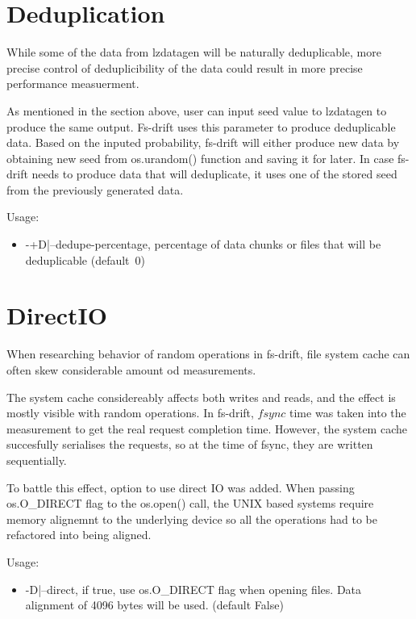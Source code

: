 \documentclass[
  color, %
  table, %
  lof,   %
  lot,   %
]{fithesis3}
\begin{document}
\section{Deduplication}
While some of the data from lzdatagen will be naturally deduplicable, more precise control of deduplicibility of the data could result in more precise performance measuerment.

As mentioned in the section above, user can input seed value to lzdatagen to produce the same output. Fs-drift uses this parameter to produce deduplicable data. Based on the inputed probability, fs-drift will either produce new data by obtaining new seed from os.urandom() function and saving it for later. In case fs-drift needs to produce data that will deduplicate, it uses one of the stored seed from the previously generated data.

Usage:
\begin{itemize}
    \item -+D|--dedupe-percentage, percentage of data chunks or files that will be deduplicable (default~0)
\end{itemize}


\section{DirectIO}
When researching behavior of random operations in fs-drift, file system cache can often skew considerable amount od measurements.


The system cache considereably affects both writes and reads, and the effect is mostly visible with random operations. In fs-drift, $fsync$ time was taken into the measurement to get the real request completion time. However, the system cache succesfully serialises the requests, so at the time of fsync, they are written sequentially.

To battle this effect, option to use direct IO was added. When passing os.O\_DIRECT flag to the os.open() call, the UNIX based systems require memory alignemnt to the underlying device so all the operations had to be refactored into being aligned.

Usage:
\begin{itemize}
    \item -D|--direct, if true, use os.O\_DIRECT flag when opening files. Data alignment of 4096 bytes will be used. (default False)
\end{itemize}
\end{document}

